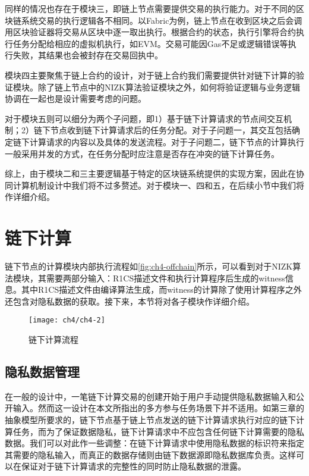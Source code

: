 同样的情况也存在于模块三，即链上节点需要提供交易的执行能力。对于不同的区块链系统交易的执行逻辑各不相同。以Fabric为例，链上节点在收到区块之后会调用区块验证器将交易从区块中逐一取出执行。根据合约的状态，执行引擎将合约执行任务分配给相应的虚拟机执行，如EVM。交易可能因Gas不足或逻辑错误等执行失败，其结果也会被封存在交易回执中。

模块四主要聚焦于链上合约的设计，对于链上合约我们需要提供针对链下计算的验证模块。除了链上节点中的NIZK算法验证模块之外，如何将验证逻辑与业务逻辑协调在一起也是设计需要考虑的问题。

对于模块五则可以细分为两个子问题，即1）基于链下计算请求的节点间交互机制；2）链下节点收到链下计算请求后的任务分配。对于子问题一，其交互包括确定链下计算请求的内容以及具体的发送流程。对于子问题二，链下节点的计算执行一般采用并发的方式，在任务分配时应注意是否存在冲突的链下计算任务。

综上，由于模块二和三主要逻辑基于特定的区块链系统提供的实现方案，因此在协同计算机制设计中我们将不过多赘述。对于模块一、四和五，在后续小节中我们将作详细介绍。

\section{链下计算}
链下节点的计算模块内部执行流程如\autoref{fig:ch4-offchain}所示，可以看到对于NIZK算法模块，其需要两部分输入：R1CS描述文件和执行计算程序后生成的witness信息。其中R1CS描述文件由编译算法生成，而witness的计算除了使用计算程序之外还包含对隐私数据的获取。接下来，本节将对各子模块作详细介绍。
\begin{figure}[htbp]
    \centering
    \texttt{[image: ch4/ch4-2]}
    \caption{\label{fig:ch4-offchain}链下计算流程}
\end{figure}
\subsection{隐私数据管理}
在一般的设计中，一笔链下计算交易的创建开始于用户手动提供隐私数据输入和公开输入。然而这一设计在本文所指出的多方参与任务场景下并不适用。如第三章的抽象模型所要求的，链下节点基于链上节点发送的链下计算请求执行对应的链下计算任务，而为了保证数据隐私，链下计算请求中不应包含任何链下计算需要的隐私数据。我们可以对此作一些调整：在链下计算请求中使用隐私数据的标识符来指定其需要的隐私输入，而真正的数据存储则由链下数据源即隐私数据库负责。这样可以在保证对于链下计算请求的完整性的同时防止隐私数据的泄露。

